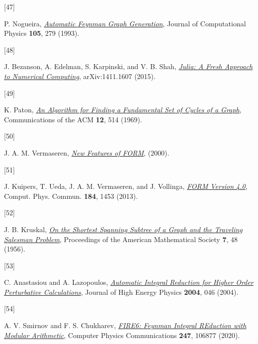 \documentclass[
  10pt,
  a4paper,
  DIV=11,
  numbers=noendperiod,
  oneside]{scrreprt}
\newlength{\cslhangindent}
\newlength{\csllabelwidth}
\newlength{\cslentryspacingunit} %
\newenvironment{CSLReferences}[2] %
 {%
  \setlength{\parindent}{0pt}
  \ifodd #1
  \let\oldpar\par
  \def\par{\hangindent=\cslhangindent\oldpar}
  \fi
  \setlength{\parskip}{#2\cslentryspacingunit}
 }%
 {}
\newcommand{\CSLLeftMargin}[1]{\parbox[t]{\csllabelwidth}{#1}}
\newcommand{\CSLRightInline}[1]{\parbox[t]{\linewidth - \csllabelwidth}{#1}\break}
\DeclareRobustCommand{\[}{\begin{equation}}
\DeclareRobustCommand{\]}{\end{equation}}
\begin{document}
\begin{CSLReferences}{0}{0}
\leavevmode{}%
\CSLLeftMargin{{[}47{]} }%
\CSLRightInline{P. Nogueira,
\emph{\href{https://doi.org/10.1006/jcph.1993.1074}{Automatic {Feynman
Graph Generation}}}, Journal of Computational Physics \textbf{105}, 279
(1993).}

\leavevmode{}%
\CSLLeftMargin{{[}48{]} }%
\CSLRightInline{J. Bezanson, A. Edelman, S. Karpinski, and V. B. Shah,
\emph{\href{https://arxiv.org/abs/1411.1607}{Julia: {A Fresh Approach}
to {Numerical Computing}}}, arXiv:1411.1607 (2015).}

\leavevmode{}%
\CSLLeftMargin{{[}49{]} }%
\CSLRightInline{K. Paton,
\emph{\href{https://doi.org/10.1145/363219.363232}{An Algorithm for
Finding a Fundamental Set of Cycles of a Graph}}, Communications of the
ACM \textbf{12}, 514 (1969).}

\leavevmode{}%
\CSLLeftMargin{{[}50{]} }%
\CSLRightInline{J. A. M. Vermaseren,
\emph{\href{https://arxiv.org/abs/math-ph/0010025}{New Features of
{FORM}}}, (2000).}

\leavevmode{}%
\CSLLeftMargin{{[}51{]} }%
\CSLRightInline{J. Kuipers, T. Ueda, J. A. M. Vermaseren, and J.
Vollinga, \emph{\href{https://doi.org/10.1016/j.cpc.2012.12.028}{{FORM}
Version 4.0}}, Comput. Phys. Commun. \textbf{184}, 1453 (2013).}

\leavevmode{}%
\CSLLeftMargin{{[}52{]} }%
\CSLRightInline{J. B. Kruskal,
\emph{\href{https://doi.org/10.1090/S0002-9939-1956-0078686-7}{On the
Shortest Spanning Subtree of a Graph and the Traveling Salesman
Problem}}, Proceedings of the American Mathematical Society \textbf{7},
48 (1956).}

\leavevmode{}%
\CSLLeftMargin{{[}53{]} }%
\CSLRightInline{C. Anastasiou and A. Lazopoulos,
\emph{\href{https://doi.org/10.1088/1126-6708/2004/07/046}{Automatic
{Integral Reduction} for {Higher Order Perturbative Calculations}}},
Journal of High Energy Physics \textbf{2004}, 046 (2004).}

\leavevmode{}%
\CSLLeftMargin{{[}54{]} }%
\CSLRightInline{A. V. Smirnov and F. S. Chukharev,
\emph{\href{https://doi.org/10.1016/j.cpc.2019.106877}{{FIRE6}: {Feynman
Integral REduction} with {Modular Arithmetic}}}, Computer Physics
Communications \textbf{247}, 106877 (2020).}


\end{CSLReferences}
\end{document}

